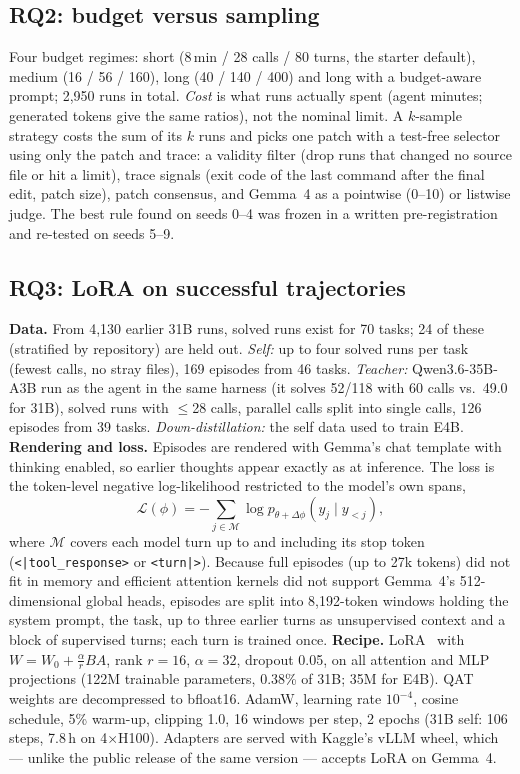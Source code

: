 \documentclass[conference]{IEEEtran}
\begin{document}
\subsection{RQ2: budget versus sampling}
Four budget regimes: short (8\,min / 28 calls / 80 turns, the starter default), medium (16 / 56 / 160), long (40 / 140 / 400) and long with a budget-aware prompt; 2,950 runs in total. \emph{Cost} is what runs actually spent (agent minutes; generated tokens give the same ratios), not the nominal limit. A $k$-sample strategy costs the sum of its $k$ runs and picks one patch with a test-free selector using only the patch and trace: a validity filter (drop runs that changed no source file or hit a limit), trace signals (exit code of the last command after the final edit, patch size), patch consensus, and Gemma~4 as a pointwise (0--10) or listwise judge. The best rule found on seeds 0--4 was frozen in a written pre-registration and re-tested on seeds 5--9.

\subsection{RQ3: LoRA on successful trajectories}
\textbf{Data.} From 4,130 earlier 31B runs, solved runs exist for 70 tasks; 24 of these (stratified by repository) are held out. \emph{Self:} up to four solved runs per task (fewest calls, no stray files), 169 episodes from 46 tasks. \emph{Teacher:} Qwen3.6-35B-A3B run as the agent in the same harness (it solves 52/118 with 60 calls vs.\ 49.0 for 31B), solved runs with $\le$28 calls, parallel calls split into single calls, 126 episodes from 39 tasks. \emph{Down-distillation:} the self data used to train E4B.
\textbf{Rendering and loss.} Episodes are rendered with Gemma's chat template with thinking enabled, so earlier thoughts appear exactly as at inference. The loss is the token-level negative log-likelihood restricted to the model's own spans,
\begin{equation}
\mathcal{L}(\phi) = -\sum_{j \in \mathcal{M}} \log p_{\theta+\Delta\phi}(y_j \mid y_{<j}),
\end{equation}
where $\mathcal{M}$ covers each model turn up to and including its stop token (\texttt{<|tool\_response>} or \texttt{<turn|>}). Because full episodes (up to 27k tokens) did not fit in memory and efficient attention kernels did not support Gemma~4's 512-dimensional global heads, episodes are split into 8,192-token windows holding the system prompt, the task, up to three earlier turns as unsupervised context and a block of supervised turns; each turn is trained once.
\textbf{Recipe.} LoRA~\cite{hu2022lora} with $W = W_0 + \tfrac{\alpha}{r}BA$, rank $r=16$, $\alpha=32$, dropout 0.05, on all attention and MLP projections (122M trainable parameters, 0.38\% of 31B; 35M for E4B). QAT weights are decompressed to bfloat16. AdamW, learning rate $10^{-4}$, cosine schedule, 5\% warm-up, clipping 1.0, 16 windows per step, 2 epochs (31B self: 106 steps, 7.8\,h on 4$\times$H100). Adapters are served with Kaggle's vLLM wheel, which --- unlike the public release of the same version --- accepts LoRA on Gemma~4.
\end{document}
